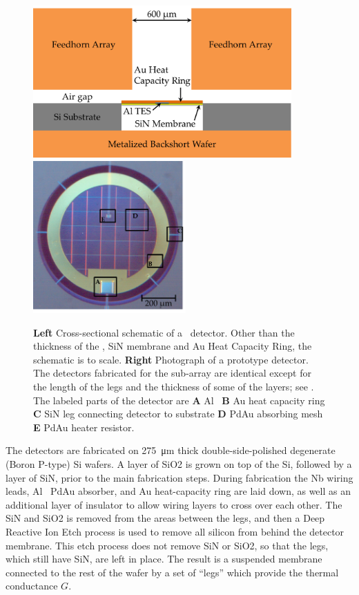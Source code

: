 \begin{figure}
\centering
\includegraphics[width=3.9in]{images/ch5-det-schematic.png}
\includegraphics[width=2.3in]{images/ch5-proto-pixel-labeled.png}
\caption[Detector cross-section and photograph]{
  \textbf{Left} Cross-sectional schematic of a \Imager\ detector.
  Other than the thickness of the \TES, SiN membrane and Au Heat Capacity Ring, the schematic is to scale.
  \textbf{Right} Photograph of a prototype detector.
  The detectors fabricated for the sub-array are identical except for the length of the legs and the thickness of some of the layers; see .
  The labeled parts of the detector are \textbf{A} Al \TES\ \textbf{B} Au heat capacity ring \textbf{C} SiN leg connecting detector to substrate \textbf{D} PdAu absorbing mesh \textbf{E} PdAu heater resistor.
}
\label{fig:ch5-det-layout}
\end{figure}

The detectors are fabricated on \SI{275}{\um} thick double-side-polished degenerate (Boron P-type) Si wafers.
A layer of SiO2 is grown on top of the Si, followed by a layer of SiN, prior to the main fabrication steps.
During fabrication the Nb wiring leads, Al \TES\, PdAu absorber, and Au heat-capacity ring are laid down, as well as an additional layer of insulator to allow wiring layers to cross over each other.
The SiN and SiO2 is removed from the areas between the legs, and then a Deep Reactive Ion Etch process is used to remove all silicon from behind the detector membrane.
This etch process does not remove SiN or SiO2, so that the legs, which still have SiN, are left in place.
The result is a suspended membrane connected to the rest of the wafer by a set of ``legs'' which provide the thermal conductance $G$.

